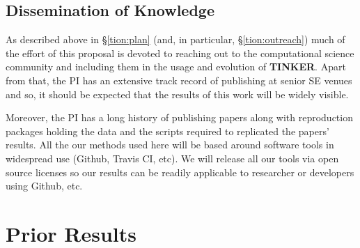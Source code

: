 \documentclass{NSF}
\newcommand{\IT}{{\bf {\sffamily TINKER}}}
\newcommand{\tion}[1]{\S\ref{tion:#1}}
\newcommand{\IT}{{\bf {\sffamily TINKER}}}
\begin{document}
\begin{nsfdescription}



%
\subsection{Dissemination of Knowledge}
As described above in \tion{plan} (and, in particular, \tion{outreach}) much of the effort
of this proposal is devoted to reaching out to
the computational science community and including them
in the usage and evolution of {\IT}. 
Apart from that, the PI has  an extensive track record of publishing at senior SE venues and so, it should be expected that the results of this work will be widely visible.

Moreover, the PI has a long history of publishing papers along with reproduction packages holding the data and the scripts required to replicated the papers' results. 
All the our methods used here will be based around software tools in widespread use (Github, Travis CI, etc). 
We will release all our tools via open source licenses so our results can be readily applicable to researcher or developers using Github, etc. 

 
\section{Prior Results}
\label{sec:PriorResults}




\end{nsfdescription}
\end{document}

